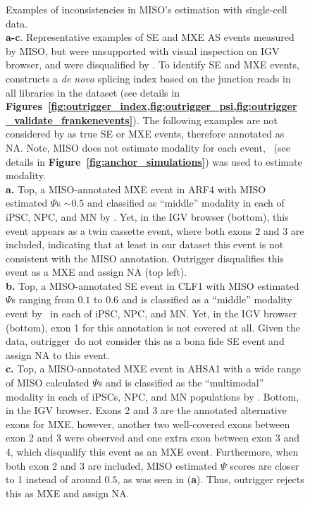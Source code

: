 \clearpage
\thispagestyle{facingcaption}
\begin{figure}[h]
\captionsetup{labelformat=prev-page}
  \caption[Examples of inconsistencies in MISO's estimation with single-cell data.]{Examples of inconsistencies in MISO's estimation with single-cell data.\\
\textbf{a-c}. Representative examples of SE and MXE AS events measured by MISO, but were unsupported with visual inspection on IGV browser, and were disqualified by \outrigger. To identify SE and MXE events, \outrigger\, constructs a \emph{de novo} splicing index based on the junction reads in all libraries in the dataset (see details in \textbf{Figures~\cref{fig:outrigger_index,fig:outrigger_psi,fig:outrigger_validate_frankenevents}}). The following examples are not considered by \outrigger as true SE or MXE events, therefore annotated as NA. Note, MISO does not estimate modality for each event, \anchor\, (see details in \textbf{Figure~\ref{fig:anchor_simulations}}) was used to estimate modality.\\
\textbf{a.} Top, a MISO-annotated MXE event in ARF4 with MISO estimated $\Psi$s $\sim0.5$ and classified as ``middle'' modality in each of iPSC, NPC, and MN by \anchor. Yet, in the IGV browser (bottom), this event appears as a twin cassette event, where both exons 2 and 3 are included, indicating that at least in our dataset this event is not consistent with the MISO annotation. Outrigger disqualifies this event as a MXE and assign NA (top left).\\
\textbf{b.} Top, a MISO-annotated SE event in CLF1 with MISO estimated $\Psi$s ranging from $0.1$ to $0.6$ and is classified as a ``middle'' modality event by \anchor\, in each of iPSC, NPC, and MN.  Yet, in the IGV browser (bottom), exon 1 for this annotation is not covered at all. Given the data, outrigger\ do not consider this as a bona fide SE event and assign NA to this event.\\
\textbf{c.} Top, a MISO-annotated MXE event in AHSA1 with a wide range of MISO calculated $\Psi$s and is classified as the ``multimodal'' modality in each of iPSCs, NPC, and MN populations by \anchor. Bottom, in the IGV browser. Exons 2 and 3 are the annotated alternative exons for MXE, however, another two well-covered exons between exon 2 and 3 were observed and one extra exon between exon 3 and 4, which disqualify this event as an MXE event. Furthermore, when both exon 2 and 3 are included, MISO estimated $\Psi$ scores are closer to 1 instead of around $0.5$, as was seen in (\textbf{a}). Thus, outrigger rejects this as MXE and assign NA.\\
}
\end{figure}
